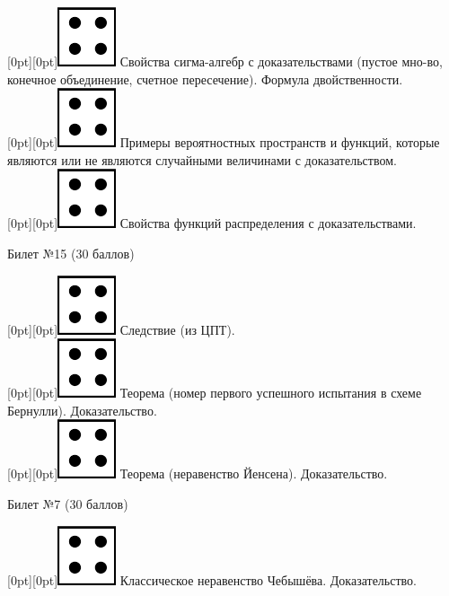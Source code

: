 \documentclass[10pt]{article}
\begin{document}
\raisebox{-1pt}[0pt][0pt]{\includegraphics[width=0.02\linewidth]{4.png}} Свойства сигма-алгебр с доказательствами (пустое мно-во, конечное объединение, счетное пересечение). Формула двойственности. \\

\raisebox{-1pt}[0pt][0pt]{\includegraphics[width=0.02\linewidth]{4.png}} Примеры вероятностных пространств и функций, которые являются или не являются случайными величинами с доказательством. \\

\raisebox{-1pt}[0pt][0pt]{\includegraphics[width=0.02\linewidth]{4.png}} Свойства функций распределения с доказательствами. \\

\begin{center} {\Large Билет №15 (30 баллов)} \end{center}

\raisebox{-1pt}[0pt][0pt]{\includegraphics[width=0.02\linewidth]{4.png}} Следствие (из ЦПТ). \\

\raisebox{-1pt}[0pt][0pt]{\includegraphics[width=0.02\linewidth]{4.png}} Теорема (номер первого успешного испытания в схеме Бернулли). Доказательство. \\

\raisebox{-1pt}[0pt][0pt]{\includegraphics[width=0.02\linewidth]{4.png}} Теорема (неравенство Йенсена). Доказательство. \\

\begin{center} {\Large Билет №7 (30 баллов)} \end{center}

\raisebox{-1pt}[0pt][0pt]{\includegraphics[width=0.02\linewidth]{4.png}} Классическое неравенство Чебышёва. Доказательство. \\
\end{document}
